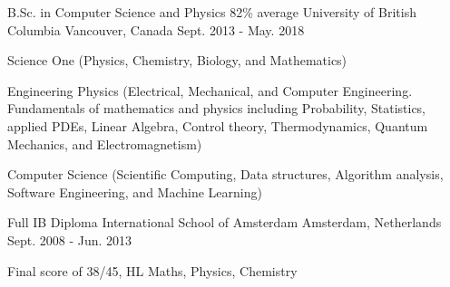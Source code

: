 


\begin{cventries}


\cventry
{B.Sc. in Computer Science and Physics 82\% average} %
{University of British Columbia} %
{Vancouver, Canada} %
{Sept. 2013 - May. 2018} %
{ %
\begin{cvitems}
\item{Science One (Physics, Chemistry, Biology, and Mathematics)}
\item{Engineering Physics (Electrical, Mechanical, and Computer Engineering. Fundamentals of mathematics and physics including Probability, Statistics, applied PDEs, Linear Algebra, Control theory, Thermodynamics, Quantum Mechanics, and Electromagnetism)}
\item{Computer Science (Scientific Computing, Data structures, Algorithm analysis, Software Engineering, and Machine Learning)}
\end{cvitems}
}


\cventry
{Full IB Diploma} %
{International School of Amsterdam} %
{Amsterdam, Netherlands}
{Sept. 2008 - Jun. 2013}
{ %
\begin{cvitems}
\item{Final score of 38/45, HL Maths, Physics, Chemistry}
\end{cvitems}
}

\end{cventries}